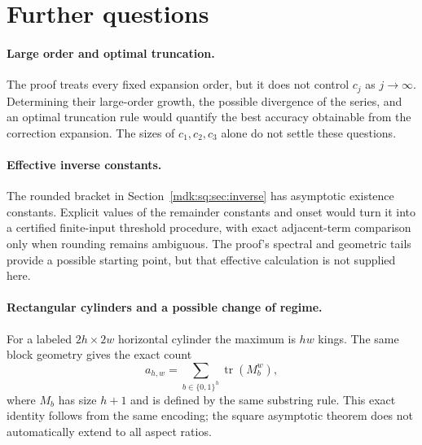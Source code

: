 \documentclass[11pt,letterpaper]{article}
\numberwithin{equation}{section}
\theoremstyle{remark}\newtheorem{remark}[theorem]{Remark}
\DeclareMathOperator{\tr}{tr}\DeclareMathOperator{\TV}{TV}
\begin{document}
\section{Further questions}\label{mdk:sq:sec:further}
\paragraph{Large order and optimal truncation.}
The proof treats every fixed expansion order, but it does not control $c_j$ as $j\to\infty$. Determining their large-order growth, the possible divergence of the series, and an optimal truncation rule would quantify the best accuracy obtainable from the correction expansion. The sizes of $c_1,c_2,c_3$ alone do not settle these questions.

\paragraph{Effective inverse constants.}
The rounded bracket in Section~\ref{mdk:sq:sec:inverse} has asymptotic existence constants. Explicit values of the remainder constants and onset would turn it into a certified finite-input threshold procedure, with exact adjacent-term comparison only when rounding remains ambiguous. The proof's spectral and geometric tails provide a possible starting point, but that effective calculation is not supplied here.

\paragraph{Rectangular cylinders and a possible change of regime.}
For a labeled $2h\times2w$ horizontal cylinder the maximum is $hw$ kings. The same block geometry gives the exact count
\[
a_{h,w}=\sum_{b\in\{0,1\}^h}\tr(M_b^w),
\]
where $M_b$ has size $h+1$ and is defined by the same substring rule. This exact identity follows from the same encoding; the square asymptotic theorem does not automatically extend to all aspect ratios.
\end{document}
